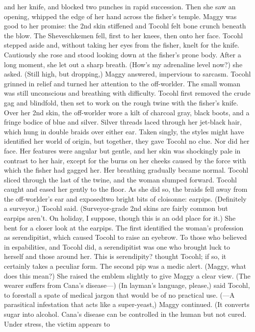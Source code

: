 \documentclass[9pt]{article}
\begin{document}
and her knife, and blocked two punches in rapid succession.
Then she saw an opening, whipped the edge of her hand across the fisher’s temple. Maggy was good
to her promise: the 2nd skin stiffened and Tocohl felt bone crunch beneath the blow.
The Sheveschkemen fell, first to her knees, then onto her face. Tocohl stepped aside and, without
taking her eyes from the fisher, knelt for the knife.
Cautiously she rose and stood looking down at the fisher’s prone body. After a long moment, she let
out a sharp breath. (How’s my adrenaline level now?) she asked.
(Still high, but dropping,) Maggy answered, impervious to sarcasm.
Tocohl grinned in relief and turned her attention to the off-worlder. The small woman was still
unconscious and breathing with difficulty. Tocohl first removed the crude gag and blindfold, then set to
work on the rough twine with the fisher’s knife.
Over her 2nd skin, the off-worlder wore a kilt of charcoal gray, black boots, and a fringe bodice of
blue and silver. Silver threads laced through her jet-black hair, which hung in double braids over either
ear. Taken singly, the styles might have identified her world of origin, but together, they gave Tocohl no
clue.
Nor did her face. Her features were angular but gentle, and her skin was shockingly pale in contrast
to her hair, except for the burns on her cheeks caused by the force with which the fisher had gagged her.
Her breathing gradually became normal.
Tocohl sliced through the last of the twine, and the woman slumped forward. Tocohl caught and
eased her gently to the floor. As she did so, the braids fell away from the off-worlder’s ear and exposedtwo bright bits of cloisonne: earpips.
(Definitely a surveyor,) Tocohl said. (Surveyor-grade 2nd skins are fairly common but earpips aren’t.
On holiday, I suppose, though this is an odd place for it.) She bent for a closer look at the earpips.
The first identified the woman’s profession as serendipitist, which caused Tocohl to raise an
eyebrow. To those who believed in espabilities, and Tocohl did, a serendipitist was one who brought
luck to herself and those around her. This is serendipity? thought Tocohl; if so, it certainly takes a peculiar
form.
The second pip was a medic alert. (Maggy, what does this mean?) She raised the emblem slightly to
give Maggy a clear view.
(The wearer suffers from Cana’s disease—)
(In layman’s language, please,) said Tocohl, to forestall a spate of medical jargon that would be of no
practical use.
(—A parasitical infestation that acts like a super-yeast,) Maggy continued. (It converts sugar into
alcohol. Cana’s disease can be controlled in the human but not cured. Under stress, the victim appears to
\end{document}
